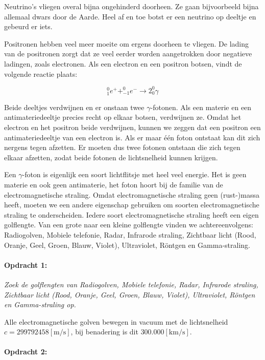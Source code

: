 Neutrino's vliegen overal bijna ongehinderd doorheen. Ze gaan bijvoorbeeld
bijna allemaal dwars door de Aarde. Heel af en toe botst er een neutrino
op deeltje en gebeurd er iets.

Positronen hebben veel meer moeite om ergens doorheen te vliegen.
De lading van de positronen zorgt dat ze veel eerder worden aangetrokken
door negatieve ladingen, zoals electronen. Als een electron en een
positron botsen, vindt de volgende reactie plaats:

\begin{equation}
_{1}^{0}e^{+}+_{-1}^{0}e^{-}\rightarrow2_{0}^{0}\gamma
\end{equation}


Beide deeltjes verdwijnen en er onstaan twee $\gamma$-fotonen. Als
een materie en een antimateriedeeltje precies recht op elkaar botsen,
verdwijnen ze. Omdat het electron en het positron beide verdwijnen,
kunnen we zeggen dat een positron een antimateriedeeltje van een electron
is. Als er maar één foton ontstaat kan dit zich nergens tegen afzetten.
Er moeten dus twee fotonen ontstaan die zich tegen elkaar afzetten,
zodat beide fotonen de lichtsnelheid kunnen krijgen.

Een $\gamma$-foton is eigenlijk een soort lichtflitsje met heel veel
energie. Het is geen materie en ook geen antimaterie, het foton hoort
bij de familie van de electromagnetische straling. Omdat electromagnetische
straling geen (rust-)massa heeft, moeten we een andere eigenschap
gebruiken om soorten electromagnetische straling te onderscheiden.
Iedere soort electromagnetische straling heeft een eigen golflengte.
Van een grote naar een kleine golflengte vinden we achtereenvolgens:
Radiogolven, Mobiele telefonie, Radar, Infrarode straling, Zichtbaar
licht (Rood, Oranje, Geel, Groen, Blauw, Violet), Ultraviolet, Röntgen
en Gamma-straling.


\paragraph*{Opdracht 1:}

\emph{Zoek de golflengten van Radiogolven, Mobiele telefonie, Radar,
Infrarode straling, Zichtbaar licht (Rood, Oranje, Geel, Groen, Blauw,
Violet), Ultraviolet, Röntgen en Gamma-straling op.}

Alle electromagnetische golven bewegen in vacuum met de lichtsnelheid
$c=299792458[\mathrm{m/s}]$, bij benadering is dit $300.000[\mathrm{km/s}]$.


\paragraph*{Opdracht 2:}

